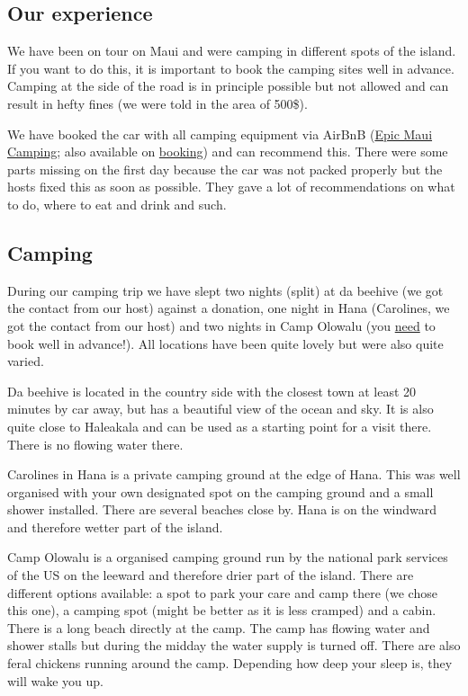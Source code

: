 \documentclass[11pt,a4paper,sans,english]{article}
\begin{document}
\subsection{Our experience}
We have been on tour on Maui and were camping in different spots of the island. If you want to do this, it is important to book the camping sites well in advance. Camping at the side of the road is in principle possible but not allowed and can result in hefty fines (we were told in the area of 500\$).

We have booked the car with all camping equipment via AirBnB (\href{https://www.airbnb.ch/rooms/616735436873706871?locale=de&_set_bev_on_new_domain=1662911427_MTY3OGU4ZDE4YjEz&source_impression_id=p3_1679528299_XFqNRPO05C1SrsGq}{Epic Maui Camping}; also available on \href{https://www.booking.com/hotel/us/epic-maui-camping-1.de.html?auth_success=1}{booking}) and can recommend this. There were some parts missing on the first day because the car was not packed properly but the hosts fixed this as soon as possible. They gave a lot of recommendations on what to do, where to eat and drink and such.

\subsection{Camping}
During our camping trip we have slept two nights (split) at da beehive (we got the contact from our host) against a donation, one night in Hana (Carolines, we got the contact from our host) and two nights in Camp Olowalu (you \underline{need} to book well in advance!). All locations have been quite lovely but were also quite varied. 

Da beehive is located in the country side with the closest town at least 20 minutes by car away, but has a beautiful view of the ocean and sky. It is also quite close to Haleakala and can be used as a starting point for a visit there. There is no flowing water there.

Carolines in Hana is a private camping ground at the edge of Hana. This was well organised with your own designated spot on the camping ground and a small shower installed. There are several beaches close by. Hana is on the windward and therefore wetter part of the island.

Camp Olowalu is a organised camping ground run by the national park services of the US on the leeward and therefore drier part of the island. There are different options available: a spot to park your care and camp there (we chose this one), a camping spot (might be better as it is less cramped) and a cabin. There is a long beach directly at the camp. The camp has flowing water and shower stalls but during the midday the water supply is turned off. There are also feral chickens running around the camp. Depending how deep your sleep is, they will wake you up.
\end{document}
